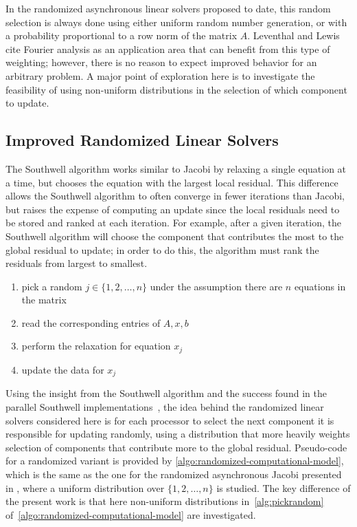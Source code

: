 \documentclass{article}
\theoremstyle{definition}
\theoremstyle{example}
\theoremstyle{example}
\theoremstyle{example}
\begin{document}
In the randomized asynchronous linear solvers proposed to date, this random selection is always done using either uniform random number generation, or with a probability proportional to a row norm of the matrix $A$. Leventhal and Lewis cite Fourier analysis \cite{leventhal2010randomized} as an application area that can benefit from this type of weighting; however, there is no reason to expect improved behavior for an arbitrary problem. A major point of exploration here is to investigate the feasibility of using non-uniform distributions in the selection of which component to update.

\subsection{Improved Randomized Linear Solvers}
\label{sect:improved-randomized-linear-solvers}

The Southwell algorithm \cite{southwell1946relaxation} works similar to Jacobi by relaxing a single equation at a time, but chooses the equation with the largest local residual. This difference allows the Southwell algorithm to often converge in fewer iterations than Jacobi, but raises the expense of computing an update since the local residuals need to be stored and ranked at each iteration. For example, after a given iteration, the Southwell algorithm will choose the component that contributes the most to the global residual to update; in order to do this, the algorithm must rank the residuals from largest to smallest.

\begin{enumerate}
	\item pick a random $j \in \{1, 2, \ldots, n\}$ under the assumption there are $n$ equations in the matrix
	\item read the corresponding entries of $A, x, b$
	\item perform the relaxation for equation $x_j$
	\item update the data for $x_j$
\end{enumerate}

Using the insight from the Southwell algorithm and the success found in the parallel Southwell implementations~\cite{wolfson2016reducing,wolfson2017distributed}, the idea behind the randomized linear solvers considered here is for each processor to select the next component it is responsible for updating randomly, using a distribution that more heavily weights selection of components that contribute more to the global residual.  Pseudo-code for a randomized variant is provided by \cref{algo:randomized-computational-model}, which is the same as the one for the randomized asynchronous Jacobi presented in \cite{avron2015revisiting}, where a  uniform distribution over $\{1, 2, \ldots, n\}$ is studied. The key difference of the present work is that here non-uniform distributions  in~\cref{alg:pickrandom} of~\cref{algo:randomized-computational-model} are investigated. 
\end{document}
